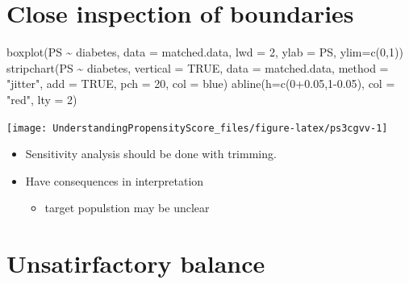 \documentclass[
]{book}
\newenvironment{Shaded}{\begin{snugshade}}{\end{snugshade}}
\newcommand{\AttributeTok}[1]{\textcolor[rgb]{0.77,0.63,0.00}{#1}}
\newcommand{\ConstantTok}[1]{\textcolor[rgb]{0.00,0.00,0.00}{#1}}
\newcommand{\DecValTok}[1]{\textcolor[rgb]{0.00,0.00,0.81}{#1}}
\newcommand{\FloatTok}[1]{\textcolor[rgb]{0.00,0.00,0.81}{#1}}
\newcommand{\FunctionTok}[1]{\textcolor[rgb]{0.00,0.00,0.00}{#1}}
\newcommand{\NormalTok}[1]{#1}
\newcommand{\SpecialCharTok}[1]{\textcolor[rgb]{0.00,0.00,0.00}{#1}}
\newcommand{\StringTok}[1]{\textcolor[rgb]{0.31,0.60,0.02}{#1}}
\providecommand{\tightlist}{%
  \setlength{\itemsep}{0pt}\setlength{\parskip}{0pt}}
\begin{document}
\hypertarget{close-inspection-of-boundaries}{%
\section{Close inspection of boundaries}\label{close-inspection-of-boundaries}}

\begin{Shaded}
\begin{Highlighting}[]
\FunctionTok{boxplot}\NormalTok{(PS }\SpecialCharTok{\textasciitilde{}}\NormalTok{ diabetes, }\AttributeTok{data =}\NormalTok{ matched.data, }
        \AttributeTok{lwd =} \DecValTok{2}\NormalTok{, }\AttributeTok{ylab =} \StringTok{\textquotesingle{}PS\textquotesingle{}}\NormalTok{, }\AttributeTok{ylim=}\FunctionTok{c}\NormalTok{(}\DecValTok{0}\NormalTok{,}\DecValTok{1}\NormalTok{))}
\FunctionTok{stripchart}\NormalTok{(PS }\SpecialCharTok{\textasciitilde{}}\NormalTok{ diabetes, }\AttributeTok{vertical =} \ConstantTok{TRUE}\NormalTok{, }
           \AttributeTok{data =}\NormalTok{ matched.data, }\AttributeTok{method =} \StringTok{"jitter"}\NormalTok{, }
           \AttributeTok{add =} \ConstantTok{TRUE}\NormalTok{, }\AttributeTok{pch =} \DecValTok{20}\NormalTok{, }\AttributeTok{col =} \StringTok{\textquotesingle{}blue\textquotesingle{}}\NormalTok{)}
\FunctionTok{abline}\NormalTok{(}\AttributeTok{h=}\FunctionTok{c}\NormalTok{(}\DecValTok{0}\FloatTok{+0.05}\NormalTok{,}\DecValTok{1}\FloatTok{{-}0.05}\NormalTok{), }\AttributeTok{col =} \StringTok{"red"}\NormalTok{, }\AttributeTok{lty =} \DecValTok{2}\NormalTok{)}
\end{Highlighting}
\end{Shaded}

\texttt{[image: UnderstandingPropensityScore\_files/figure-latex/ps3cgvv-1]}

\begin{itemize}
\tightlist
\item
  Sensitivity analysis should be done with trimming.
\item
  Have consequences in interpretation

  \begin{itemize}
  \tightlist
  \item
    target populstion may be unclear
  \end{itemize}
\end{itemize}

\hypertarget{unsatirfactory-balance}{%
\section{Unsatirfactory balance}\label{unsatirfactory-balance}}
\end{document}

